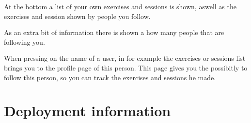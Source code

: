 \documentclass[11pt,a4paper]{scrartcl}
\begin{document}
At the bottom a list of your own exercises and sessions is shown, aswell as the exercises and session shown by people you follow.

As an extra bit of information there is shown a how many people that are following you. 

When pressing on the name of a user, in for example the exercises or sessions list brings you to the profile page of this person.
This page gives you the possibitly to follow this person, so you can track the exercises and sessions he made.
\section{Deployment information}


\newpage        %

\newpage
\printindex                             %
\end{document}
